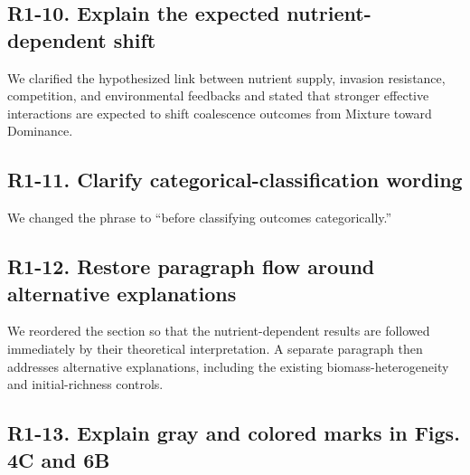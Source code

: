 \subsection*{R1-10. Explain the expected nutrient-dependent shift}


We clarified the hypothesized link between nutrient supply, invasion resistance, competition, and environmental feedbacks and stated that stronger effective interactions are expected to shift coalescence outcomes from Mixture toward Dominance.

\subsection*{R1-11. Clarify categorical-classification wording}


We changed the phrase to ``before classifying outcomes categorically.''

\subsection*{R1-12. Restore paragraph flow around alternative explanations}


We reordered the section so that the nutrient-dependent results are followed immediately by their theoretical interpretation. A separate paragraph then addresses alternative explanations, including the existing biomass-heterogeneity and initial-richness controls.

\subsection*{R1-13. Explain gray and colored marks in Figs. 4C and 6B}



